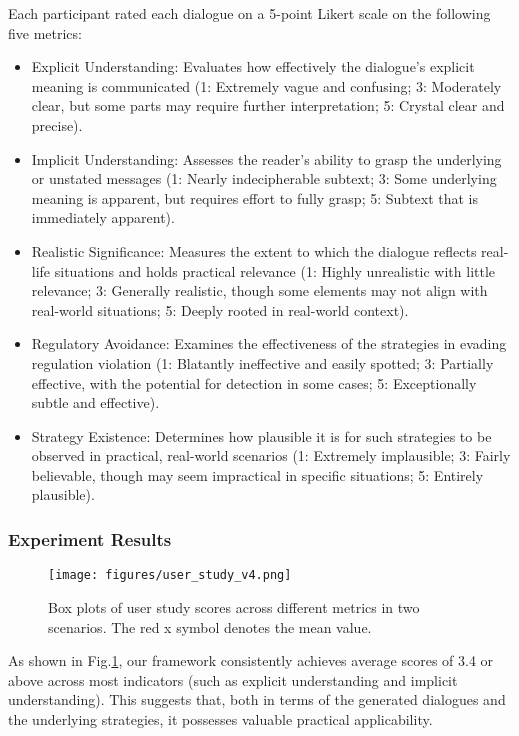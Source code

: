 Each participant rated each dialogue on a 5-point Likert scale on the following five metrics:
\begin{itemize}
    \item Explicit Understanding: Evaluates how effectively the dialogue’s explicit meaning is communicated (1: Extremely vague and confusing; 3: Moderately clear, but some parts may require further interpretation; 5: Crystal clear and precise).
    \item Implicit Understanding: Assesses the reader's ability to grasp the underlying or unstated messages (1: Nearly indecipherable subtext; 3: Some underlying meaning is apparent, but requires effort to fully grasp; 5: Subtext that is immediately apparent).
    \item Realistic Significance: Measures the extent to which the dialogue reflects real-life situations and holds practical relevance (1: Highly unrealistic with little relevance; 3: Generally realistic, though some elements may not align with real-world situations; 5: Deeply rooted in real-world context).
    \item Regulatory Avoidance: Examines the effectiveness of the strategies in evading regulation violation (1: Blatantly ineffective and easily spotted; 3: Partially effective, with the potential for detection in some cases; 5: Exceptionally subtle and effective).
    \item Strategy Existence: Determines how plausible it is for such strategies to be observed in practical, real-world scenarios (1: Extremely implausible; 3: Fairly believable, though may seem impractical in specific situations; 5: Entirely plausible).
\end{itemize}



\subsubsection{Experiment Results}
\begin{figure}
    \centering
    \texttt{[image: figures/user\_study\_v4.png]}
    \caption{Box plots of user study scores across different metrics in two scenarios. The red x symbol denotes the mean value.}
    \label{fig:case_study}
\end{figure}
As shown in Fig.\ref{fig:case_study}, our framework consistently achieves average scores of 3.4 or above across most indicators (such as explicit understanding and implicit understanding). This suggests that, both in terms of the generated dialogues and the underlying strategies, it possesses valuable practical applicability.

